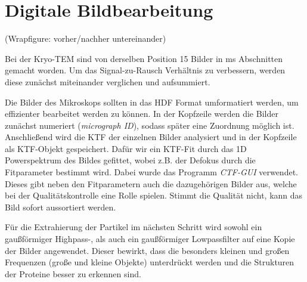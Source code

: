 \section{Digitale Bildbearbeitung} %
\label{sec:bildbearbeitung}

(Wrapfigure: vorher/nachher untereinander)

Bei der Kryo-TEM sind von derselben Position 15 Bilder in \unit[200]{ms} Abschnitten gemacht worden.
Um das Signal-zu-Rausch Verhältnis zu verbessern, werden diese zunächst miteinander verglichen und aufsummiert.

Die Bilder des Mikroskops sollten in das HDF Format umformatiert werden, um effizienter bearbeitet werden zu können.
In der Kopfzeile werden die Bilder zunächst numeriert (\textit{micrograph ID}), sodass später eine Zuordnung möglich ist.
Anschließend wird die KTF der einzelnen Bilder analysiert und in der Kopfzeile als KTF-Objekt gespeichert.
Dafür wir ein KTF-Fit durch das 1D Powerspektrum des Bildes gefittet, wobei z.B. der Defokus durch die Fitparameter bestimmt wird.
Dabei wurde das Programm \textit{CTF-GUI} verwendet.
Dieses gibt neben den Fitparametern auch die dazugehörigen Bilder aus, welche bei der Qualitätskontrolle eine Rolle spielen.
Stimmt die Qualität nicht, kann das Bild sofort aussortiert werden.

Für die Extrahierung der Partikel im nächsten Schritt wird sowohl ein gaußförmiger Highpass-, als auch ein gaußförmiger Lowpassfilter auf eine Kopie der Bilder angewendet.
Dieser bewirkt, dass die besonders kleinen und großen Frequenzen (große und kleine Objekte) unterdrückt werden und die Strukturen der Proteine besser zu erkennen sind.

\FloatBarrier
